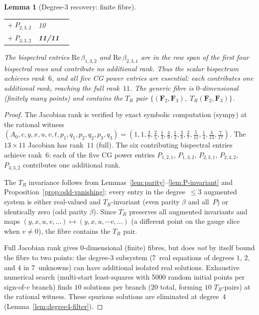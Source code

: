 \documentclass[11pt]{article}
\newtheorem{lemma}[theorem]{Lemma}
\begin{document}
\begin{lemma}[Degree-3 recovery: finite fibre]
\begin{center}
\begin{tabular}{llc}
  $+\;P_{2,3,2}$ & 10 \\
  $+\;P_{3,3,2}$ & \textbf{11/11} \\
\end{tabular}
\end{center}
The bispectral entries $\mathrm{Re}\,\beta_{1,3,2}$ and
$\mathrm{Re}\,\beta_{2,3,1}$ are in the row span of the first four
bispectral rows and contribute no additional rank.
Thus the scalar bispectrum achieves rank~$6$, and \emph{all five}
CG power entries are essential: each contributes one additional rank,
reaching the full rank~$11$.
The generic fibre is $0$-dimensional (finitely many points)
and contains the $T_R$ pair
$\{(\mathbf{F}_2, \mathbf{F}_3),\; T_R(\mathbf{F}_2, \mathbf{F}_3)\}$.
\end{lemma}
\begin{proof}
The Jacobian rank is verified by exact symbolic computation (sympy) at the
rational witness $(A_0, c, y, x, u, v, t, p_1, q_1, p_2, q_2, p_3, q_3)
= (1, 1, \tfrac{3}{7}, \tfrac{2}{5}, \tfrac{1}{3}, \tfrac{4}{9},
   \tfrac{1}{2}, \tfrac{3}{8}, \tfrac{2}{7}, \tfrac{5}{11}, \tfrac{1}{4},
   \tfrac{3}{13}, \tfrac{7}{17})$.
The $13 \times 11$ Jacobian has rank~$11$ (full).
The six contributing bispectral entries achieve rank~$6$; each of the five
CG power entries $P_{1,2,1}$, $P_{1,3,2}$, $P_{2,3,1}$, $P_{2,3,2}$,
$P_{3,3,2}$ contributes one additional rank.

The $T_R$ invariance follows from Lemmas~\ref{lem:parity}--\ref{lem:P-invariant}
and Proposition~\ref{prop:odd-vanishing}: every entry in the degree~$\le 3$
augmented system is either real-valued and $T_R$-invariant (even parity $\beta$
and all~$P$) or identically zero (odd parity $\beta$).
Since $T_R$ preserves all augmented invariants and maps
$(y,x,u,v,\ldots) \mapsto (y,x,u,-v,\ldots)$ (a different point on the gauge
slice when $v \ne 0$), the fibre contains the $T_R$ pair.

Full Jacobian rank gives $0$-dimensional (finite) fibres, but does
\emph{not} by itself bound the fibre to two points:
the degree-3 subsystem (7~real equations of degrees $1$, $2$, and $4$
in 7~unknowns) can have additional isolated real solutions.
Exhaustive numerical search (multi-start least-squares with 5000 random
initial points per sign-of-$v$ branch) finds $10$ solutions per branch
($20$ total, forming $10$ $T_R$-pairs) at the rational witness.
These spurious solutions are eliminated at degree~$4$
(Lemma~\ref{lem:degree4-filter}).
\end{proof}
\end{document}
